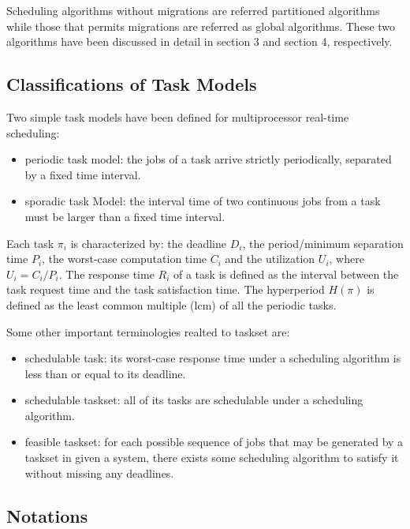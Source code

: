 \documentclass[preprint,12pt]{elsarticle}
\begin{document}
Scheduling algorithms without migrations are referred partitioned algorithms while those that permits migrations are referred as global algorithms. These two algorithms have been discussed in detail in section 3 and section 4, respectively.


\subsection{Classifications of Task Models}
Two simple task models have been defined for multiprocessor real-time scheduling\cite{davis2011survey}:

\begin{itemize}
\item periodic task model: the jobs of a task arrive strictly periodically, separated by a fixed time interval.
\item sporadic task Model: the interval time of two continuous jobs from a task must be larger than a fixed time interval.
\end{itemize}

Each task $\pi_i$ is characterized by: the deadline $D_i$, the period/minimum separation time $P_i$, the worst-case computation time $C_i$ and the utilization $U_i$, where $U_i = C_i/P_i$. The response time $R_i$ of a task is defined as the interval between the task request time and the task satisfaction time. The hyperperiod $H(\pi)$ is defined as the least common multiple (lcm) of all the periodic tasks.

Some other important terminologies realted to taskset are\cite{davis2011survey}:


\begin{itemize}

\item schedulable task: its worst-case response time under a scheduling algorithm is less than or equal to its deadline.

\item schedulable taskset: all of its tasks are schedulable under a scheduling algorithm.

\item feasible taskset: for each possible sequence of jobs that may be generated by a taskset in given a system, there exists some scheduling algorithm to satisfy it without missing any deadlines.

\end{itemize}


\subsection{Notations}
\end{document}
